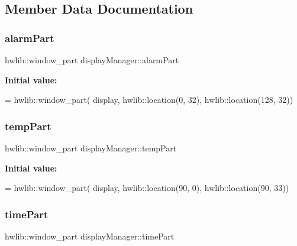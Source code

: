 \subsection{Member Data Documentation}
\mbox{\label{classdisplay_manager_a73d646fd98bc65ff9c7b07de99beff16}} 
\subsubsection{\texorpdfstring{alarm\+Part}{alarmPart}}
{\footnotesize\ttfamily hwlib\+::window\+\_\+part display\+Manager\+::alarm\+Part\hspace{0.3cm}{\ttfamily [private]}}

{\bfseries Initial value\+:}
\begin{DoxyCode}
= hwlib::window\_part(
                                       display,
                                       hwlib::location(0, 32),
                                       hwlib::location(128, 32))
\end{DoxyCode}
\mbox{\label{classdisplay_manager_a5b264a2f367cf0ed9889600ddfc2df50}} 
\subsubsection{\texorpdfstring{temp\+Part}{tempPart}}
{\footnotesize\ttfamily hwlib\+::window\+\_\+part display\+Manager\+::temp\+Part\hspace{0.3cm}{\ttfamily [private]}}

{\bfseries Initial value\+:}
\begin{DoxyCode}
= hwlib::window\_part(
                                       display,
                                       hwlib::location(90, 0),
                                       hwlib::location(90, 33))
\end{DoxyCode}
\mbox{\label{classdisplay_manager_a4b9db493edbfbe3c2f159de0c2efa11f}} 
\subsubsection{\texorpdfstring{time\+Part}{timePart}}
{\footnotesize\ttfamily hwlib\+::window\+\_\+part display\+Manager\+::time\+Part\hspace{0.3cm}{\ttfamily [private]}}

